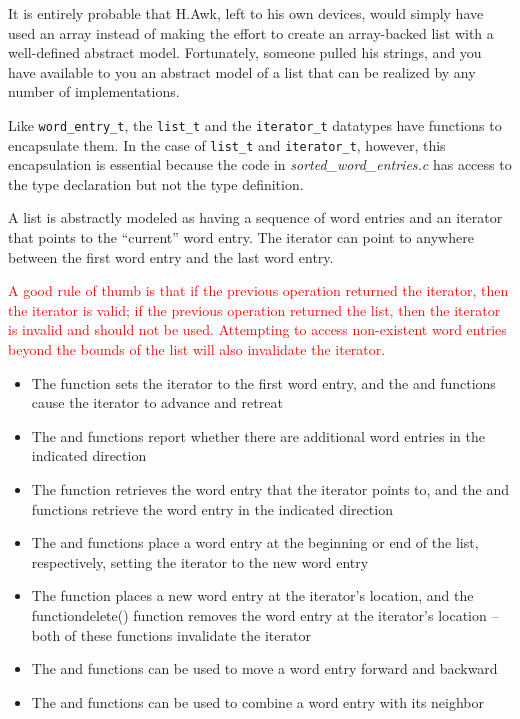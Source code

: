 It is entirely probable that H.Awk, left to his own devices, would simply have used an array instead of making the effort to create an array-backed list with a well-defined abstract model.
Fortunately, someone pulled his strings, and you have available to you an abstract model of a list that can be realized by any number of implementations.

Like \lstinline{word_entry_t}, the \lstinline{list_t} and the \lstinline{iterator_t} datatypes have functions to encapsulate them.
In the case of \lstinline{list_t} and \lstinline{iterator_t}, however, this encapsulation is essential because the code in \textit{sorted\_word\_entries.c} has access to the type declaration but not the type definition.

\begin{description}
\end{description}

A list is abstractly modeled as having a sequence of word entries and an iterator that points to the ``current'' word entry.
The iterator can point to anywhere between the first word entry and the last word entry.

\textcolor{red}{
A good rule of thumb is that if the previous operation returned the iterator, then the iterator is valid;
if the previous operation returned the list, then the iterator is invalid and should not be used.
Attempting to access non-existent word entries beyond the bounds of the list will also invalidate the iterator.
}

\begin{itemize}
    \item The  function sets the iterator to the first word entry, and the  and  functions cause the iterator to advance and retreat
    \item The  and  functions report whether there are additional word entries in the indicated direction
    \item The  function retrieves the word entry that the iterator points to, and the  and  functions retrieve the word entry in the indicated direction
    \item The  and  functions place a word entry at the beginning or end of the list, respectively, setting the iterator to the new word entry
    \item The  function places a new word entry at the iterator's location, and the function{delete()} function removes the word entry at the iterator's location -- both of these functions invalidate the iterator
    \item The  and  functions can be used to move a word entry forward and backward
    \item The  and  functions can be used to combine a word entry with its neighbor
\end{itemize}

